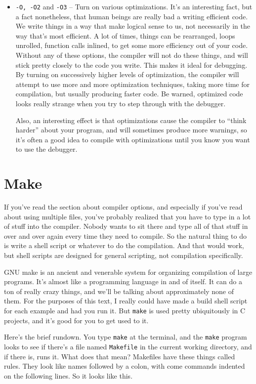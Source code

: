 \documentclass[ebook,11pt,oneside,openany]{memoir}
\newcommand{\cf}[1]{\texttt{#1}}
\begin{document}
\begin{itemize}
\item \cf{-O, -O2} and \cf{-O3} -- Turn on various optimizations. It's an interesting fact, but a fact nonetheless, that human beings are really bad a writing efficient code. We write things in a way that make logical sense to us, not necessarily in the way that's most efficient. A lot of times, things can be rearranged, loops unrolled, function calls inlined, to get some more efficiency out of your code. Without any of these options, the compiler will not do these things, and will stick pretty closely to the code you write. This makes it ideal for debugging. By turning on successively higher levels of optimization, the compiler will attempt to use more and more optimization techniques, taking more time for compilation, but usually producing faster code. Be warned, optimized code looks really strange when you try to step through with the debugger.

Also, an interesting effect is that optimizations cause the compiler to ``think harder'' about your program, and will sometimes produce more warnings, so it's often a good idea to compile with optimizations until you know you want to use the debugger.
\end{itemize}

\section{Make}

If you've read the section about compiler options, and especially if you've read about using multiple files, you've probably realized that you have to type in a lot of stuff into the compiler. Nobody wants to sit there and type all of that stuff in over and over again every time they need to compile. So the natural thing to do is write a shell script or whatever to do the compilation. And that would work, but shell scripts are designed for general scripting, not compilation specifically.

GNU make is an ancient and venerable system for organizing compilation of large programs. It's almost like a programming language in and of itself. It can do a ton of really crazy things, and we'll be talking about approximately none of them. For the purposes of this text, I really could have made a build shell script for each example and had you run it. But \cf{make} is used pretty ubiquitously in C projects, and it's good for you to get used to it.

Here's the brief rundown. You type \cf{make} at the terminal, and the \cf{make} program looks to see if there's a file named \cf{Makefile} in the current working directory, and if there is, runs it. What does that mean? Makefiles have these things called rules. They look like names followed by a colon, with come commands indented on the following lines. So it looks like this.
\end{document}

